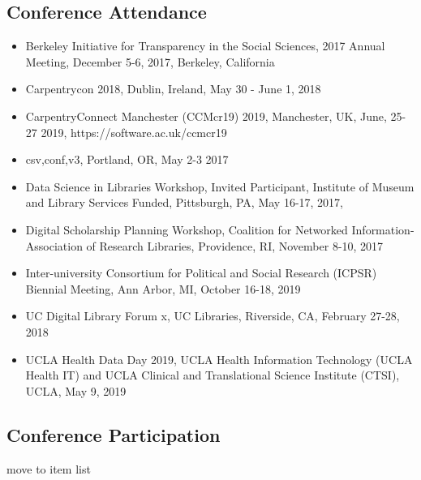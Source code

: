 \subsection{Conference Attendance}

\begin{itemize}[label={},leftmargin=!,labelindent=5pt,itemindent=-15pt]
  \item Berkeley Initiative for Transparency in the Social Sciences, 2017 Annual Meeting, December 5-6, 2017, Berkeley, California
  \item Carpentrycon 2018, Dublin, Ireland, May 30 - June 1, 2018
  \item CarpentryConnect Manchester (CCMcr19) 2019, Manchester, UK, June, 25-27 2019, https://software.ac.uk/ccmcr19
  \item csv,conf,v3, Portland, OR, May 2-3 2017
  \item Data Science in Libraries Workshop, Invited Participant, Institute of Museum and Library Services Funded, Pittsburgh, PA, May 16-17, 2017,
  \item Digital Scholarship Planning Workshop, Coalition for Networked Information-Association of Research Libraries, Providence, RI, November 8-10, 2017
  \item Inter-university Consortium for Political and Social Research (ICPSR) Biennial Meeting, Ann Arbor, MI, October 16-18, 2019
  \item UC Digital Library Forum x, UC Libraries, Riverside, CA, February 27-28, 2018
  \item UCLA Health Data Day 2019, UCLA Health Information Technology (UCLA Health IT) and UCLA Clinical and Translational Science Institute (CTSI), UCLA, May 9, 2019
\end{itemize}


\subsection{Conference Participation}

\nocite{*}
\printbibliography[keyword={outlib-conf-part},title={Conference Participation},heading=none]
\todo move to item list 


